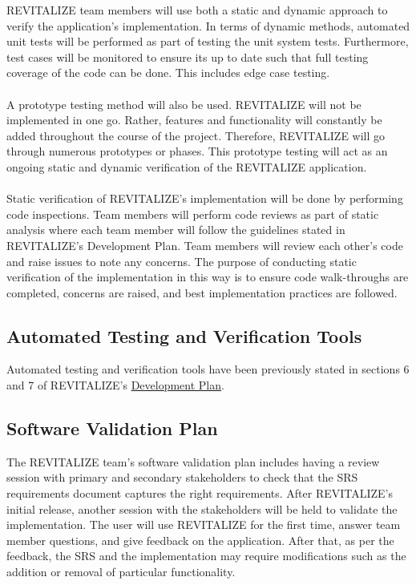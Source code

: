 \documentclass[12pt, titlepage]{article}
\begin{document}
REVITALIZE team members will use both a static and dynamic approach to verify the application's implementation. In terms of dynamic methods, automated unit tests will be performed as part of testing the unit system tests. Furthermore, test cases will be monitored to ensure its up to date such that full testing coverage of the code can be done. This includes edge case testing.\\\\
A prototype testing method will also be used. REVITALIZE will not be implemented in one go. Rather, features and functionality will constantly be added throughout the course of the project. Therefore, REVITALIZE will go through numerous prototypes or phases. This prototype testing will act as an ongoing static and dynamic verification of the REVITALIZE application.\\\\
Static verification of REVITALIZE's implementation will be done by performing code inspections. Team members will perform code reviews as part of static analysis where each team member will follow the guidelines stated in REVITALIZE's Development Plan. Team members will review each other's code and raise issues to note any concerns. The purpose of conducting static verification of the implementation in this way is to ensure code walk-throughs are completed, concerns are raised, and best implementation practices are followed.

\subsection{Automated Testing and Verification Tools}

Automated testing and verification tools have been previously stated in sections 6 and 7 of REVITALIZE's \href{https://github.com/BillNguyen1999/REVITALIZE/blob/main/docs/DevelopmentPlan/DevelopmentPlan.pdf}{\color{blue}Development Plan}.

\subsection{Software Validation Plan}

The REVITALIZE team's software validation plan includes having a review session with primary and secondary stakeholders to check that the SRS requirements document captures the right requirements. After REVITALIZE's initial release, another session with the stakeholders will be held to validate the implementation. The user will use REVITALIZE for the first time, answer team member questions, and give feedback on the application. After that, as per the feedback, the SRS and the implementation may require modifications such as the addition or removal of particular functionality.
\end{document}
